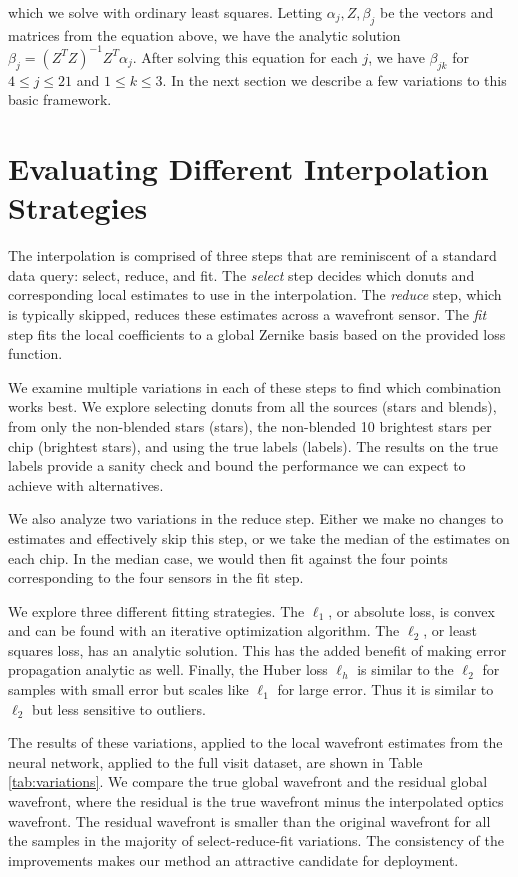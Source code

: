 \noindent which we solve with ordinary least squares. Letting $\alpha_j, Z, \beta_j$ be the vectors and matrices from the equation above, we have the analytic solution $\beta_j = (Z^TZ)^{-1}Z^T\alpha_j$. After solving this equation for each $j$, we have $\beta_{jk}$ for $4 \leq j \leq 21$ and $1 \leq k \leq 3$. In the next section we describe a few variations to this basic framework.

\section{Evaluating Different Interpolation Strategies}

The interpolation is comprised of three steps that are reminiscent of a standard data query: select, reduce, and fit. The \textit{select} step decides which donuts and corresponding local estimates to use in the interpolation. The \textit{reduce} step, which is typically skipped, reduces these estimates across a wavefront sensor. The \textit{fit} step fits the local coefficients to a global Zernike basis based on the provided loss function.

We examine multiple variations in each of these steps to find which combination works best. We explore selecting donuts from all the sources (stars and blends), from only the non-blended stars (stars), the non-blended 10 brightest stars per chip (brightest stars), and using the true labels (labels). The results on the true labels provide a sanity check and bound the performance we can expect to achieve with alternatives. 

We also analyze two variations in the reduce step. Either we make no changes to estimates and effectively skip this step, or we take the median of the estimates on each chip. In the median case, we would then fit against the four points corresponding to the four sensors in the fit step. 

We explore three different fitting strategies. The $\ell_1$, or absolute loss, is convex and can be found with an iterative optimization algorithm. The $\ell_2$, or least squares loss, has an analytic solution. This has the added benefit of making error propagation analytic as well. Finally, the Huber loss $\ell_h$ is similar to the $\ell_2$ for samples with small error but scales like $\ell_1$ for large error. Thus it is similar to $\ell_2$ but less sensitive to outliers.

The results of these variations, applied to the local wavefront estimates from the neural network, applied to the full visit dataset, are shown in Table \ref{tab:variations}. We compare the true global wavefront and the residual global wavefront, where the residual is the true wavefront minus the interpolated optics wavefront. The residual wavefront is smaller than the original wavefront for all the samples in the majority of select-reduce-fit variations. The consistency of the improvements makes our method an attractive candidate for deployment.

